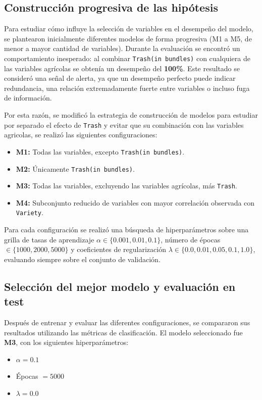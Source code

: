 \documentclass[journal]{IEEEtran}
\begin{document}
\subsection{Construcción progresiva de las hipótesis}
Para estudiar cómo influye la selección de variables en el desempeño del modelo, se plantearon inicialmente diferentes modelos de forma progresiva (M1 a M5, de menor a mayor cantidad de variables). Durante la evaluación se encontró un comportamiento inesperado: al combinar \texttt{Trash(in bundles)} con cualquiera de las variables agrícolas se obtenía un desempeño del \textbf{100\%}. Este resultado se consideró una señal de alerta, ya que un desempeño perfecto puede indicar redundancia, una relación extremadamente fuerte entre variables o incluso fuga de información.

Por esta razón, se modificó la estrategia de construcción de modelos para estudiar por separado el efecto de \texttt{Trash} y evitar que su combinación con las variables agricolas, se realizó las siguientes configuraciones:

\begin{itemize}
    \item \textbf{M1:} Todas las variables, excepto \texttt{Trash(in bundles)}.
    \item \textbf{M2:} Únicamente \texttt{Trash(in bundles)}.
    \item \textbf{M3:} Todas las variables, excluyendo las variables agrícolas, más \texttt{Trash}.
    \item \textbf{M4:} Subconjunto reducido de variables con mayor correlación observada con \texttt{Variety}.
\end{itemize}

Para cada configuración se realizó una búsqueda de hiperparámetros sobre una grilla de tasas de aprendizaje $\alpha \in \{0.001, 0.01, 0.1\}$, número de épocas $\in \{1000, 2000, 5000\}$ y coeficientes de regularización $\lambda \in \{0.0, 0.01, 0.05, 0.1, 1.0\}$, evaluando siempre sobre el conjunto de validación.

\subsection{Selección del mejor modelo y evaluación en test}
Después de entrenar y evaluar las diferentes configuraciones, se compararon sus resultados utilizando las métricas de clasificación. El modelo seleccionado fue \textbf{M3}, con los siguientes hiperparámetros:
\begin{itemize}
    \item $\alpha = 0.1$
    \item Épocas $= 5000$
    \item $\lambda = 0.0$
\end{itemize}
\end{document}
